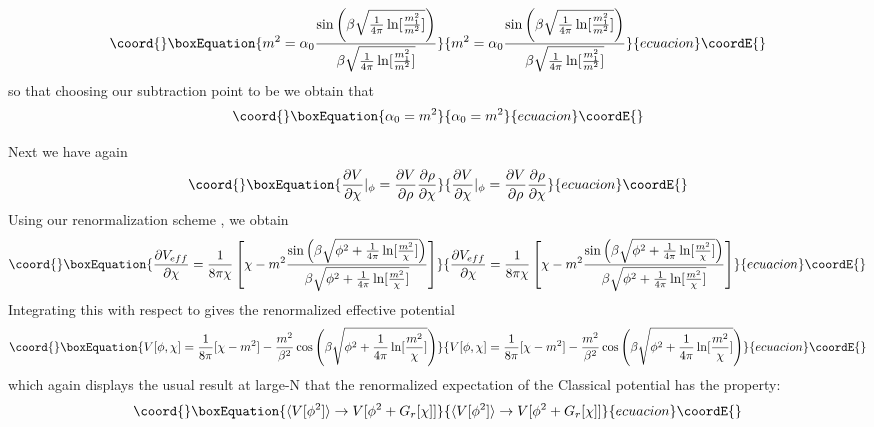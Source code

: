 \documentclass[a4paper,prd,preprint,superscriptaddress,showpacs,byrevtex]{revtex4}
\begin{document}
\begin{equation}\coord{}\boxEquation{
m^2 = \alpha_0 \frac {\sin \left( \beta \sqrt{ \frac{1}{4 \pi}
\ln[\frac{m_1^2}{m^2}]} \right)}{\beta \sqrt{
\frac{1}{4
\pi}
\ln[\frac{m_1^2}{m^2}]}}
}{
m^2 = \alpha_0 \frac {\sin \left( \beta \sqrt{ \frac{1}{4 \pi}
\ln[\frac{m_1^2}{m^2}]} \right)}{\beta \sqrt{
\frac{1}{4
\pi}
\ln[\frac{m_1^2}{m^2}]}}
}{ecuacion}\coordE{}\end{equation}
so that choosing our subtraction point to be \coordHE{} we obtain that
\begin{equation}\coord{}\boxEquation{
\alpha_0 = m^2
}{
\alpha_0 = m^2
}{ecuacion}\coordE{}\end{equation}

Next we have again
\begin{equation}\coord{}\boxEquation{
\frac{\partial V} {\partial \chi}|_{\phi} = \frac{\partial V} {\partial
\rho} \frac{\partial \rho} {\partial \chi}
}{
\frac{\partial V} {\partial \chi}|_{\phi} = \frac{\partial V} {\partial
\rho} \frac{\partial \rho} {\partial \chi}
}{ecuacion}\coordE{}\end{equation}
Using our renormalization scheme \coordHE{}, we obtain
\begin{equation}\coord{}\boxEquation{
\frac{\partial V_{eff}} {\partial \chi}= \frac{1} {8 \pi \chi} \left[\chi -
{m^2}
\frac {\sin \left( \beta \sqrt{\phi^2+ \frac{1}{4 \pi}
\ln[\frac{m^2}{\chi}]} \right)}{\beta \sqrt{
\phi^2 +\frac{1}{4
\pi}
\ln[\frac{m^2}{\chi}]}}   \right]
}{
\frac{\partial V_{eff}} {\partial \chi}= \frac{1} {8 \pi \chi} \left[\chi -
{m^2}
\frac {\sin \left( \beta \sqrt{\phi^2+ \frac{1}{4 \pi}
\ln[\frac{m^2}{\chi}]} \right)}{\beta \sqrt{
\phi^2 +\frac{1}{4
\pi}
\ln[\frac{m^2}{\chi}]}}   \right]
}{ecuacion}\coordE{}\end{equation}
Integrating this with respect to \myHighlight{$\chi$}\coordHE{} gives the renormalized effective
potential
\begin{equation}\coord{}\boxEquation{
V[\phi,\chi] = \frac{1}{8 \pi} [\chi -m^2] -\frac{m^2}{\beta^2} \cos \left(
\beta \sqrt{\phi^2+
\frac{1}{4 \pi} \ln[\frac{m^2}{\chi}]} \right)
}{
V[\phi,\chi] = \frac{1}{8 \pi} [\chi -m^2] -\frac{m^2}{\beta^2} \cos \left(
\beta \sqrt{\phi^2+
\frac{1}{4 \pi} \ln[\frac{m^2}{\chi}]} \right)
}{ecuacion}\coordE{}\end{equation}
which again displays the usual result at large-N that the renormalized
expectation of the Classical potential has the property:
\begin{equation}\coord{}\boxEquation{
\langle V[\phi^2]\rangle \rightarrow  V[\phi^2+ G_r[\chi] ]
}{
\langle V[\phi^2]\rangle \rightarrow  V[\phi^2+ G_r[\chi] ]
}{ecuacion}\coordE{}\end{equation}
\end{document}
